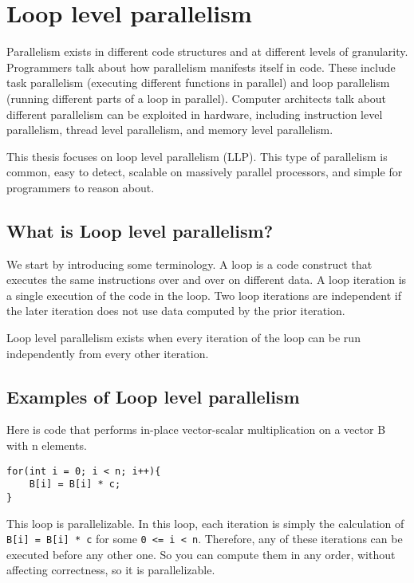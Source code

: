 \documentclass[12pt,twoside]{reedthesis}
\begin{document}
	\section{Loop level parallelism}
	
		Parallelism exists in different code structures and at different levels of granularity. Programmers talk about how parallelism manifests itself in code. These include task parallelism (executing different functions in parallel) and  loop parallelism (running different parts of a loop in parallel). Computer architects talk about different parallelism can be exploited in hardware, including instruction level parallelism, thread level parallelism, and memory level parallelism. 
		
		This thesis focuses on loop level parallelism (LLP). This type of parallelism is common, easy to detect, scalable on massively parallel processors, and simple for programmers to reason about. 
		
		\subsection{What is Loop level parallelism?}
		
		We start by introducing some terminology. A loop is a code construct that executes the same instructions over and over on different data. A loop iteration is a single execution of the code in the loop. Two loop iterations are independent if the later iteration does not use data computed by the prior iteration. 
		
		Loop level parallelism exists when every iteration of the loop can be run independently from every other iteration. 
		
		\subsection{Examples of Loop level parallelism}
		
		Here is code that performs in-place vector-scalar multiplication on a vector B with n elements. 
		
		\begin{lstlisting}
for(int i = 0; i < n; i++){
	B[i] = B[i] * c;
}
		\end{lstlisting}
		
		This loop is parallelizable. In this loop, each iteration is simply the calculation of \texttt{B[i] = B[i] * c} for some \texttt{0 <= i < n}. Therefore, any of these iterations can be executed before any other one. So you can compute them in any order, without affecting correctness, so it is parallelizable. 
		
\end{document}
